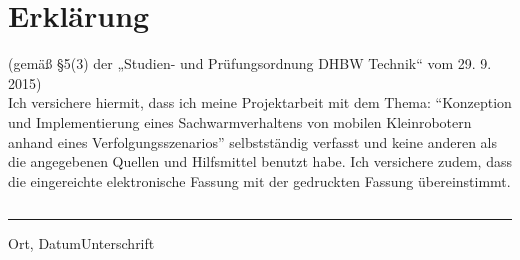 	\pagestyle{scrheadings}
	\clearscrheadfoot
	
	\section*{Erklärung}
	
	(gemäß §5(3) der „Studien- und Prüfungsordnung DHBW Technik“ vom 29. 9. 2015)\\
	Ich versichere hiermit, dass ich meine Projektarbeit mit dem Thema: \enquote{Konzeption und Implementierung eines Sachwarmverhaltens von mobilen Kleinrobotern anhand eines Verfolgungsszenarios} selbstständig verfasst und keine anderen als die angegebenen Quellen und Hilfsmittel benutzt habe. Ich versichere zudem, dass die eingereichte elektronische Fassung mit der gedruckten Fassung übereinstimmt.
	\begin{verbatim}
	\end{verbatim}
	\noindent\rule{\textwidth}{1pt}
	\noindent Ort, Datum\hfill\hfill Unterschrift